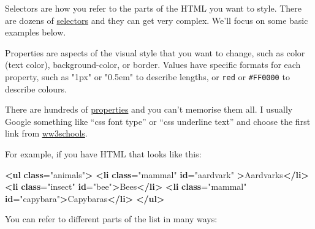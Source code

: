 \documentclass[
  oneside]{book}
\newenvironment{Shaded}{\begin{snugshade}}{\end{snugshade}}
\newcommand{\ErrorTok}[1]{\textcolor[rgb]{0.64,0.00,0.00}{\textbf{#1}}}
\newcommand{\KeywordTok}[1]{\textcolor[rgb]{0.13,0.29,0.53}{\textbf{#1}}}
\newcommand{\NormalTok}[1]{#1}
\newcommand{\OtherTok}[1]{\textcolor[rgb]{0.56,0.35,0.01}{#1}}
\newcommand{\StringTok}[1]{\textcolor[rgb]{0.31,0.60,0.02}{#1}}
\begin{document}
Selectors are how you refer to the parts of the HTML you want to style. There are dozens of \href{https://www.w3schools.com/cssref/css_selectors.asp}{selectors} and they can get very complex. We'll focus on some basic examples below.

Properties are aspects of the visual style that you want to change, such as \NormalTok{color} (text color), \NormalTok{background-color}, or \NormalTok{border}. Values have specific formats for each property, such as \StringTok{"1px"} or \StringTok{"0.5em"} to describe lengths, or \texttt{red} or \texttt{\#FF0000} to describe colours.

\begin{info}
There are hundreds of \href{https://www.w3schools.com/cssref/default.asp}{properties} and you can't memorise them all. I usually Google something like ``css font type'' or ``css underline text'' and choose the first link from \href{https://www.w3schools.com}{ww3schools}.

\end{info}

For example, if you have HTML that looks like this:

\begin{Shaded}
\begin{Highlighting}[]
\KeywordTok{\textless{}ul} \ErrorTok{class}\OtherTok{=}\StringTok{"animals"}\KeywordTok{\textgreater{}}
    \KeywordTok{\textless{}li} \ErrorTok{class}\OtherTok{=}\StringTok{"mammal"} \ErrorTok{id}\OtherTok{=}\StringTok{"aardvark"} \KeywordTok{\textgreater{}}\NormalTok{Aardvarks}\KeywordTok{\textless{}/li\textgreater{}}
    \KeywordTok{\textless{}li} \ErrorTok{class}\OtherTok{=}\StringTok{"insect"} \ErrorTok{id}\OtherTok{=}\StringTok{"bee"}\KeywordTok{\textgreater{}}\NormalTok{Bees}\KeywordTok{\textless{}/li\textgreater{}}
    \KeywordTok{\textless{}li} \ErrorTok{class}\OtherTok{=}\StringTok{"mammal"} \ErrorTok{id}\OtherTok{=}\StringTok{"capybara"}\KeywordTok{\textgreater{}}\NormalTok{Capybaras}\KeywordTok{\textless{}/li\textgreater{}}
\KeywordTok{\textless{}/ul\textgreater{}}
\end{Highlighting}
\end{Shaded}

You can refer to different parts of the list in many ways:
\end{document}
